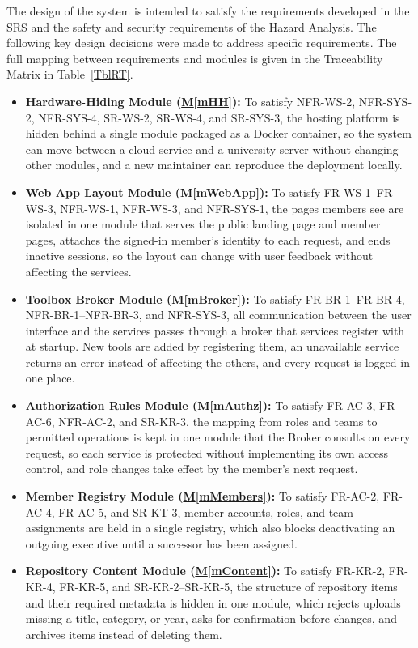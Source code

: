 \documentclass[12pt, titlepage]{article}
\newcommand{\mref}[1]{\hyperref[#1:dec]{M\ref*{#1}}}
\begin{document}
The design of the system is intended to satisfy the requirements developed in the SRS and the safety and security requirements of the Hazard Analysis. The following key design decisions were made to address specific requirements. The full mapping between requirements and modules is given in the Traceability Matrix in Table~\ref{TblRT}.

\begin{itemize}
\item \textbf{Hardware-Hiding Module (\mref{mHH}):} To satisfy NFR-WS-2, NFR-SYS-2, NFR-SYS-4, SR-WS-2, SR-WS-4, and SR-SYS-3, the hosting platform is hidden behind a single module packaged as a Docker container, so the system can move between a cloud service and a university server without changing other modules, and a new maintainer can reproduce the deployment locally.
\item \textbf{Web App Layout Module (\mref{mWebApp}):} To satisfy FR-WS-1--FR-WS-3, NFR-WS-1, NFR-WS-3, and NFR-SYS-1, the pages members see are isolated in one module that serves the public landing page and member pages, attaches the signed-in member's identity to each request, and ends inactive sessions, so the layout can change with user feedback without affecting the services.
\item \textbf{Toolbox Broker Module (\mref{mBroker}):} To satisfy FR-BR-1--FR-BR-4, NFR-BR-1--NFR-BR-3, and NFR-SYS-3, all communication between the user interface and the services passes through a broker that services register with at startup. New tools are added by registering them, an unavailable service returns an error instead of affecting the others, and every request is logged in one place.
\item \textbf{Authorization Rules Module (\mref{mAuthz}):} To satisfy FR-AC-3, FR-AC-6, NFR-AC-2, and SR-KR-3, the mapping from roles and teams to permitted operations is kept in one module that the Broker consults on every request, so each service is protected without implementing its own access control, and role changes take effect by the member's next request.
\item \textbf{Member Registry Module (\mref{mMembers}):} To satisfy FR-AC-2, FR-AC-4, FR-AC-5, and SR-KT-3, member accounts, roles, and team assignments are held in a single registry, which also blocks deactivating an outgoing executive until a successor has been assigned.
\item \textbf{Repository Content Module (\mref{mContent}):} To satisfy FR-KR-2, FR-KR-4, FR-KR-5, and SR-KR-2--SR-KR-5, the structure of repository items and their required metadata is hidden in one module, which rejects uploads missing a title, category, or year, asks for confirmation before changes, and archives items instead of deleting them.

\end{itemize}
\end{document}
